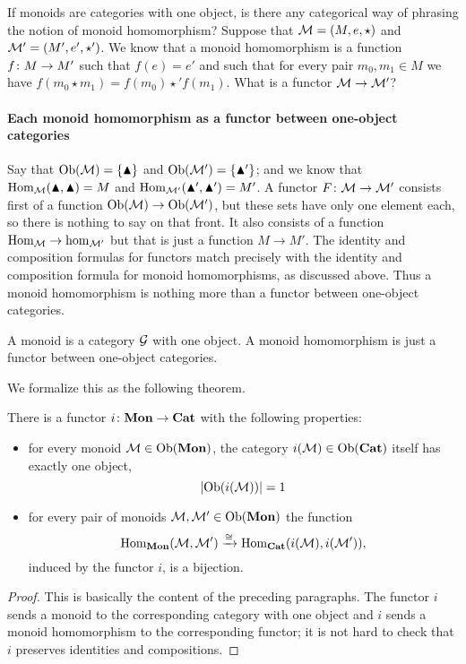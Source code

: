 If monoids are categories with one object, is there any categorical way of phrasing the notion of monoid homomorphism? Suppose that $\mathcal{M}=(M,e,\star)$ and $\mathcal{M}'=(M',e',\star')$. We know that a monoid homomorphism is a function $f\colon M\rightarrow M'$ such that $f(e)=e'$ and such that for every pair $m_0,m_1\in M$ we have $f(m_0\star m_1)=f(m_0)\star' f(m_1)$. What is a functor $\mathcal{M}\rightarrow\mathcal{M}'$? 

\paragraph{Each monoid homomorphism as a functor between one-object categories}

Say that $\textnormal{Ob}(\mathcal{M})=\{\blacktriangle\}$ and $\textnormal{Ob}(\mathcal{M}')=\{\blacktriangle'\}$; and we know that $\textnormal{Hom}_\mathcal{M}(\blacktriangle,\blacktriangle)=M$ and $\textnormal{Hom}_{\mathcal{M}'}(\blacktriangle',\blacktriangle')=M'$. A functor $F\colon\mathcal{M}\rightarrow\mathcal{M}'$ consists first of a function $\textnormal{Ob}(\mathcal{M})\rightarrow\textnormal{Ob}(\mathcal{M}')$, but these sets have only one element each, so there is nothing to say on that front. It also consists of a function $\textnormal{Hom}_\mathcal{M}\rightarrow\hom_{\mathcal{M}'}$ but that is just a function $M\to M'$. The identity and composition formulas for functors match precisely with the identity and composition formula for monoid homomorphisms, as discussed above. Thus a monoid homomorphism is nothing more than a functor between one-object categories. 
\begin{slogan}
A monoid is a category $\mathcal{G}$ with one object. A monoid homomorphism is just a functor between one-object categories.
\end{slogan}

We formalize this as the following theorem.

\begin{theorem}\label{thm:mon to cat}

There is a functor $i\colon{\bf Mon}\rightarrow{\bf Cat}$ with the following properties:
\begin{itemize}
\item for every monoid $\mathcal{M}\in\textnormal{Ob}({\bf Mon})$, the category $i(\mathcal{M})\in\textnormal{Ob}({\bf Cat})$ itself has exactly one object, $$|\textnormal{Ob}(i(\mathcal{M}))|=1$$ 
\item for every pair of monoids $\mathcal{M},\mathcal{M}'\in\textnormal{Ob}({\bf Mon})$ the function $$\textnormal{Hom}_{\bf Mon}(\mathcal{M},\mathcal{M}')\xrightarrow{\cong}\textnormal{Hom}_{\bf Cat}(i(\mathcal{M}),i(\mathcal{M}')),$$ induced by the functor $i$, is a bijection.
\end{itemize}

\end{theorem}

\begin{proof}

This is basically the content of the preceding paragraphs. The functor $i$ sends a monoid to the corresponding category with one object and $i$ sends a monoid homomorphism to the corresponding functor; it is not hard to check that $i$ preserves identities and compositions.

\end{proof}

